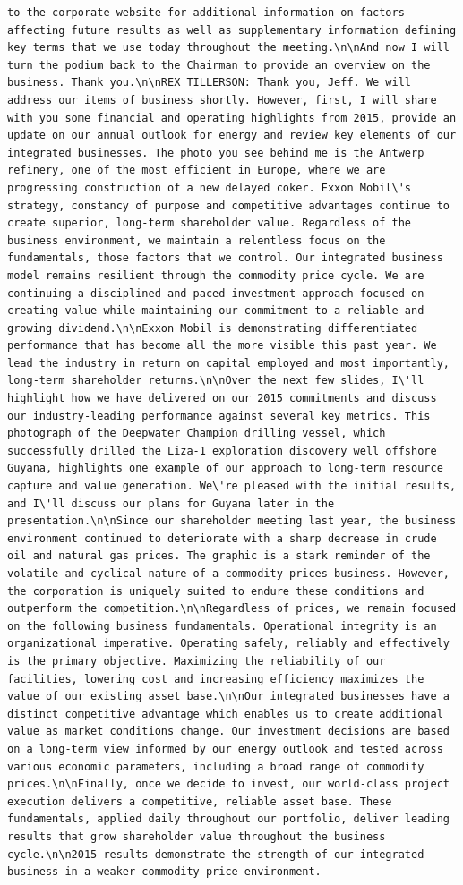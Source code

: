 \documentclass[
  letterpaper,
  DIV=11,
  numbers=noendperiod]{scrreprt}
\begin{document}
\begin{verbatim}
to the corporate website for additional information on factors affecting future results as well as supplementary information defining key terms that we use today throughout the meeting.\n\nAnd now I will turn the podium back to the Chairman to provide an overview on the business. Thank you.\n\nREX TILLERSON: Thank you, Jeff. We will address our items of business shortly. However, first, I will share with you some financial and operating highlights from 2015, provide an update on our annual outlook for energy and review key elements of our integrated businesses. The photo you see behind me is the Antwerp refinery, one of the most efficient in Europe, where we are progressing construction of a new delayed coker. Exxon Mobil\'s strategy, constancy of purpose and competitive advantages continue to create superior, long-term shareholder value. Regardless of the business environment, we maintain a relentless focus on the fundamentals, those factors that we control. Our integrated business model remains resilient through the commodity price cycle. We are continuing a disciplined and paced investment approach focused on creating value while maintaining our commitment to a reliable and growing dividend.\n\nExxon Mobil is demonstrating differentiated performance that has become all the more visible this past year. We lead the industry in return on capital employed and most importantly, long-term shareholder returns.\n\nOver the next few slides, I\'ll highlight how we have delivered on our 2015 commitments and discuss our industry-leading performance against several key metrics. This photograph of the Deepwater Champion drilling vessel, which successfully drilled the Liza-1 exploration discovery well offshore Guyana, highlights one example of our approach to long-term resource capture and value generation. We\'re pleased with the initial results, and I\'ll discuss our plans for Guyana later in the presentation.\n\nSince our shareholder meeting last year, the business environment continued to deteriorate with a sharp decrease in crude oil and natural gas prices. The graphic is a stark reminder of the volatile and cyclical nature of a commodity prices business. However, the corporation is uniquely suited to endure these conditions and outperform the competition.\n\nRegardless of prices, we remain focused on the following business fundamentals. Operational integrity is an organizational imperative. Operating safely, reliably and effectively is the primary objective. Maximizing the reliability of our facilities, lowering cost and increasing efficiency maximizes the value of our existing asset base.\n\nOur integrated businesses have a distinct competitive advantage which enables us to create additional value as market conditions change. Our investment decisions are based on a long-term view informed by our energy outlook and tested across various economic parameters, including a broad range of commodity prices.\n\nFinally, once we decide to invest, our world-class project execution delivers a competitive, reliable asset base. These fundamentals, applied daily throughout our portfolio, deliver leading results that grow shareholder value throughout the business cycle.\n\n2015 results demonstrate the strength of our integrated business in a weaker commodity price environment. 
\end{verbatim}
\end{document}
